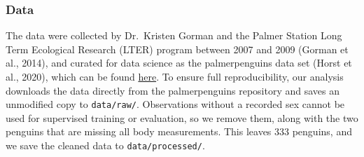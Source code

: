 \documentclass[
  letterpaper,
  DIV=11,
  numbers=noendperiod]{scrartcl}
\begin{document}
\subsubsection{Data}\label{data}

The data were collected by Dr.~Kristen Gorman and the Palmer Station
Long Term Ecological Research (LTER) program between 2007 and 2009
(Gorman et al., 2014), and curated for data science as the
palmerpenguins data set (Horst et al., 2020), which can be found
\href{https://allisonhorst.github.io/palmerpenguins/}{here}. To ensure
full reproducibility, our analysis downloads the data directly from the
palmerpenguins repository and saves an unmodified copy to
\texttt{data/raw/}. Observations without a recorded sex cannot be used
for supervised training or evaluation, so we remove them, along with the
two penguins that are missing all body measurements. This leaves 333
penguins, and we save the cleaned data to \texttt{data/processed/}.
\end{document}
